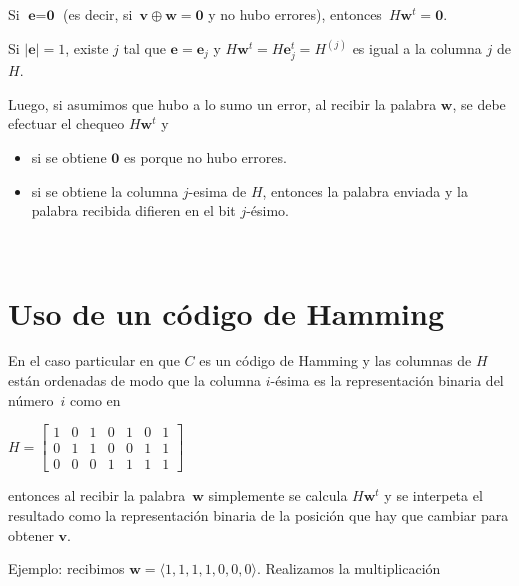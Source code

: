 \documentclass[10pt,a4paper]{article}
\begin{document}
Si $\textbf{e}=\textbf{0}$ (es decir, si $\textbf{v}\oplus \textbf{w}=\textbf{0}$ y no hubo errores), entonces $H\textbf{w}^t =\textbf{0}$.

Si $\lvert \textbf{e}\rvert = 1$, existe $j$ tal que $\textbf{e}=\textbf{e}_j$ y $H\textbf{w}^t=H\textbf{e}_j^t= H^{(j)}$ es igual a la columna $j$ de $H$.

Luego, si asumimos que hubo a lo sumo un error, al recibir la palabra $\textbf{w}$, se debe efectuar el chequeo $H\textbf{w}^t$ y

\begin{itemize}

	\item si se obtiene $\textbf{0}$ es porque no hubo errores.
	\item si se obtiene la columna $j$-esima de $H$, entonces la palabra enviada y la palabra recibida difieren en el bit $j$-ésimo.
\end{itemize}

 

\section*{Uso de un código de Hamming}

En el caso particular en que $C$ es un código de Hamming y las columnas de $H$ están ordenadas de modo que la columna $i$-ésima es la representación binaria del número $i$ como en

\begin{center}
$H= \left[ \begin{array}{ccccccc} 1&0&1&0&1&0&1\\ 0&1&1&0&0&1&1\\ 0&0&0&1&1&1&1 \end{array} \right]$
\end{center}

entonces al recibir la palabra $\textbf{w}$ simplemente se calcula $H\textbf{w}^t$ y se interpeta el resultado como la representación binaria de la posición que hay que cambiar para obtener $\textbf{v}$.

Ejemplo: recibimos $\textbf{w} = \langle1,1,1,1,0,0,0 \rangle$. Realizamos la multiplicación
\end{document}
